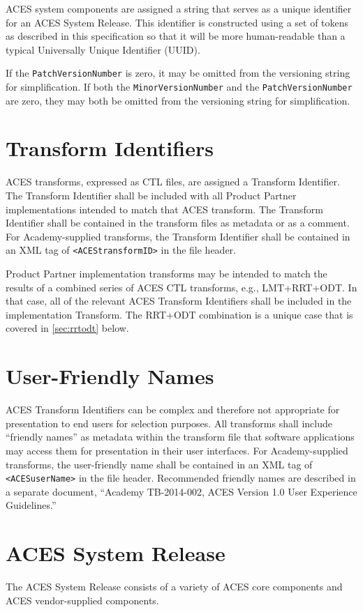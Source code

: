 ACES system components are assigned a string that serves as a unique identifier for an ACES System Release. This identifier is constructed using a set of tokens as described in this specification so that it will be more human-readable than a typical Universally Unique Identifier (UUID).

If the \texttt{PatchVersionNumber} is zero, it may be omitted from the versioning string for simplification. If both the \texttt{MinorVersionNumber} and the \texttt{PatchVersionNumber} are zero, they may both be omitted from the versioning string for simplification.

\section{Transform Identifiers}
ACES transforms, expressed as CTL files, are assigned a Transform Identifier.  The Transform Identifier shall be included with all Product Partner implementations intended to match that ACES transform. The Transform Identifier shall be contained in the transform files as metadata or as a comment. For Academy-supplied transforms, the Transform Identifier shall be contained in an XML tag of \texttt{<ACEStransformID>} in the file header.

Product Partner implementation transforms may be intended to match the results of a combined series of ACES CTL transforms, e.g., LMT+RRT+ODT.  In that case, all of the relevant ACES Transform Identifiers shall be included in the implementation Transform. The RRT+ODT combination is a unique case that is covered in \autoref{sec:rrtodt} below.

\section{User-Friendly Names}
ACES Transform Identifiers can be complex and therefore not appropriate for presentation to end users for selection purposes. All transforms shall include ``friendly names'' as metadata within the transform file that software applications may access them for presentation in their user interfaces. For Academy-supplied transforms, the user-friendly name shall be contained in an XML tag of \texttt{<ACESuserName>} in the file header. Recommended friendly names are described in a separate document, ``Academy TB-2014-002, ACES Version 1.0 User Experience Guidelines.''

\section{ACES System Release}
The ACES System Release consists of a variety of ACES core components and ACES vendor-supplied components.

